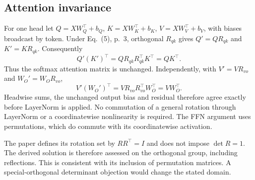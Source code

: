 \documentclass[10pt]{article}
\begin{document}
\subsection*{Attention invariance}
For one head let \(Q=XW_Q^\top+b_Q\), \(K=XW_K^\top+b_K\), \(V=XW_V^\top+b_V\), with biases broadcast by token. Under Eq. (5), p. 3, orthogonal \(R_{qk}\) gives \(Q'=QR_{qk}\) and \(K'=KR_{qk}\). Consequently \[Q'(K')^\top=QR_{qk}R_{qk}^\top K^\top=QK^\top.\] Thus the softmax attention matrix is unchanged. Independently, with \(V'=VR_{vo}\) and \(W_O'=W_OR_{vo}\), \[V'(W_O')^\top=VR_{vo}R_{vo}^\top W_O^\top=VW_O^\top.\] Headwise sums, the unchanged output bias and residual therefore agree exactly before LayerNorm is applied. No commutation of a general rotation through LayerNorm or a coordinatewise nonlinearity is required. The FFN argument uses permutations, which do commute with its coordinatewise activation.\par
The paper defines its rotation set by \(RR^\top=I\) and does not impose \(\det R=1\). The derived solution is therefore assessed on the orthogonal group, including reflections. This is consistent with its inclusion of permutation matrices. A special-orthogonal determinant objection would change the stated domain.\par
\end{document}
